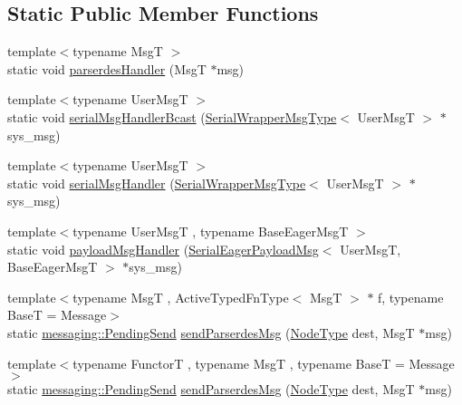 \subsection*{Static Public Member Functions}
\begin{DoxyCompactItemize}
\item 
{\footnotesize template$<$typename MsgT $>$ }\\static void \hyperlink{structvt_1_1serialization_1_1_serialized_messenger_a31b39108b4e7500d33a0f7e88867a954}{parserdes\+Handler} (MsgT $\ast$msg)
\item 
{\footnotesize template$<$typename User\+MsgT $>$ }\\static void \hyperlink{structvt_1_1serialization_1_1_serialized_messenger_adc342b3e5a4a536182f6045c5fe485b7}{serial\+Msg\+Handler\+Bcast} (\hyperlink{structvt_1_1serialization_1_1_serialized_messenger_a279027d1664b42cf7f288dc3fc9c3014}{Serial\+Wrapper\+Msg\+Type}$<$ User\+MsgT $>$ $\ast$sys\+\_\+msg)
\item 
{\footnotesize template$<$typename User\+MsgT $>$ }\\static void \hyperlink{structvt_1_1serialization_1_1_serialized_messenger_aad74b93ed6e38beb26ce31d69eb85a71}{serial\+Msg\+Handler} (\hyperlink{structvt_1_1serialization_1_1_serialized_messenger_a279027d1664b42cf7f288dc3fc9c3014}{Serial\+Wrapper\+Msg\+Type}$<$ User\+MsgT $>$ $\ast$sys\+\_\+msg)
\item 
{\footnotesize template$<$typename User\+MsgT , typename Base\+Eager\+MsgT $>$ }\\static void \hyperlink{structvt_1_1serialization_1_1_serialized_messenger_adef4a4664f9eab8eca28304871540791}{payload\+Msg\+Handler} (\hyperlink{namespacevt_1_1serialization_af3a0dfd4a0d3fa09c75edba0dc1b7fec}{Serial\+Eager\+Payload\+Msg}$<$ User\+MsgT, Base\+Eager\+MsgT $>$ $\ast$sys\+\_\+msg)
\item 
{\footnotesize template$<$typename MsgT , Active\+Typed\+Fn\+Type$<$ Msg\+T $>$ $\ast$ f, typename BaseT  = Message$>$ }\\static \hyperlink{structvt_1_1messaging_1_1_pending_send}{messaging\+::\+Pending\+Send} \hyperlink{structvt_1_1serialization_1_1_serialized_messenger_afbc39a41f677f4f9dcb32298de023295}{send\+Parserdes\+Msg} (\hyperlink{namespacevt_a866da9d0efc19c0a1ce79e9e492f47e2}{Node\+Type} dest, MsgT $\ast$msg)
\item 
{\footnotesize template$<$typename FunctorT , typename MsgT , typename BaseT  = Message$>$ }\\static \hyperlink{structvt_1_1messaging_1_1_pending_send}{messaging\+::\+Pending\+Send} \hyperlink{structvt_1_1serialization_1_1_serialized_messenger_afd18647e13a41563cb283341cfd68dd8}{send\+Parserdes\+Msg} (\hyperlink{namespacevt_a866da9d0efc19c0a1ce79e9e492f47e2}{Node\+Type} dest, MsgT $\ast$msg)

\end{DoxyCompactItemize}
